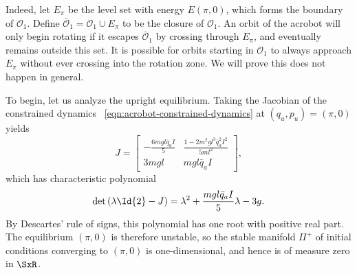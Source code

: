 Indeed, let \(E_\pi\) be the level set with energy \(E(\pi,0)\), 
which forms the boundary of \(\mathcal{O}_1\). 
Define \(\bar{\mathcal{O}}_1 = \mathcal{O}_1 \cup E_\pi\) to be the closure of
\(\mathcal{O}_1\).
An orbit of the acrobot will only begin rotating if it escapes
\(\bar{\mathcal{O}}_1\) by crossing through \(E_\pi\), and eventually remains
outside this set.
It is possible for orbits starting in \(\mathcal{O}_1\) to always approach
\(E_\pi\) without ever crossing into the rotation zone.
We will prove this does not happen in general.

To begin, let us analyze the upright equilibrium.
Taking the Jacobian of the constrained dynamics
~\eqref{eqn:acrobot-constrained-dynamics} at \((q_u,p_u) = (\pi,0)\) yields
\[
    J = \begin{bmatrix}
        -\frac{6mgl\bar{q}_aI}{5} & \frac{1 - 2m^2gl^3\bar{q}_a^2 I^2}{5ml^2} \\
        3mgl & mgl\bar{q}_aI
    \end{bmatrix}
    ,
\]
which has characteristic polynomial
\[
    \det\left(\lambda \Id{2} - J\right)
    = \lambda^2 + \frac{mgl\bar{q}_a I}{5} \lambda - 3g
    .
\]
By Descartes' rule of signs, this polynomial has one root with positive real
part. 
The equilibrium \((\pi,0)\) is therefore unstable, so the stable manifold \(\Pi^+\) of
initial conditions converging to \((\pi,0)\) is one-dimensional, and hence is
of measure zero in \(\SxR\).

